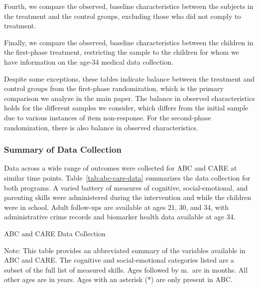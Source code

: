 

\noindent Fourth, we compare the observed, baseline characteristics between the subjects in the treatment and the control groups, excluding those who did not comply to treatment.

\noindent Finally, we compare the observed, baseline characteristics between the children in the first-phase treatment, restricting the sample to the children for whom we have information on the age-34 medical data collection.



\noindent Despite some exceptions, these tables indicate balance between the treatment and control groups from the first-phase randomization, which is the primary comparison we analyze in the main paper. The balance in observed characteristics holds for the different samples we consider, which differs from the initial sample due to various instances of item non-response. For the second-phase randomization, there is also balance in observed characteristics. \\

\subsubsection{Summary of Data Collection} \label{appendix:data-collection}

Data across a wide range of outcomes were collected for ABC and CARE at similar time points. Table~\ref{tab:abc-care-data} summarizes the data collection for both programs. A varied battery of measures of cognitive, social-emotional, and parenting skills were administered during the intervention and while the children were in school. Adult follow-ups are available at ages 21, 30, and 34, with administrative crime records and biomarker health data available at age 34.

\begin{table}[H]
\centering
\caption{ABC and CARE Data Collection}
\label{tab:abc-care-data}
\begin{threeparttable}
\footnotesize
	
\begin{tablenotes}
\footnotesize
\item Note: This table provides an abbreviated summary of the variables available in ABC and CARE. The cognitive and social-emotional categories listed are a subset of the full list of measured skills. Ages followed by m.\ are in months. All other ages are in years. Ages with an asterisk (*) are only present in ABC.
\end{tablenotes}
\end{threeparttable}
\end{table}
